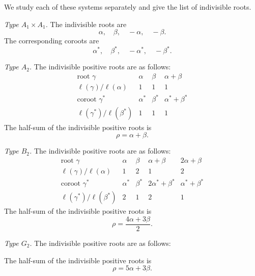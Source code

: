 We study each of these systems separately and give the list of
indivisible roots.

\medskip
\noindent\emph{Type \(A_1\times A_1\).}
The indivisible roots are
\[
 \alpha,\quad\beta,\quad-\alpha,\quad-\beta.
\]
The corresponding coroots are
\[
 \alpha^\ast,\quad\beta^\ast,\quad-\alpha^\ast,\quad-\beta^\ast.
\]

\medskip
\noindent\emph{Type \(A_2\).}
The indivisible positive roots are as follows:
\[
\begin{array}{c|ccc}
\text{root }\gamma
 &\alpha&\beta&\alpha+\beta\\ \hline
\ell(\gamma)/\ell(\alpha)
 &1&1&1\\ \hline
\text{coroot }\gamma^\ast
 &\alpha^\ast&\beta^\ast&\alpha^\ast+\beta^\ast\\ \hline
\ell(\gamma^\ast)/\ell(\beta^\ast)
 &1&1&1
\end{array}
\]
The half-sum of the indivisible positive roots is
\[
 \rho=\alpha+\beta.
\]

\medskip
\noindent\emph{Type \(B_2\).}
The indivisible positive roots are as follows:
\[
\begin{array}{c|cccc}
\text{root }\gamma
 &\alpha&\beta&\alpha+\beta&2\alpha+\beta\\ \hline
\ell(\gamma)/\ell(\alpha)
 &1&2&1&2\\ \hline
\text{coroot }\gamma^\ast
 &\alpha^\ast&\beta^\ast
 &2\alpha^\ast+\beta^\ast&\alpha^\ast+\beta^\ast\\ \hline
\ell(\gamma^\ast)/\ell(\beta^\ast)
 &2&1&2&1
\end{array}
\]
The half-sum of the indivisible positive roots is
\[
 \rho=\frac{4\alpha+3\beta}{2}.
\]

\medskip
\noindent\emph{Type \(G_2\).}
The indivisible positive roots are as follows:
\begin{center}
\end{center}
The half-sum of the indivisible positive roots is
\[
 \rho=5\alpha+3\beta.
\]

